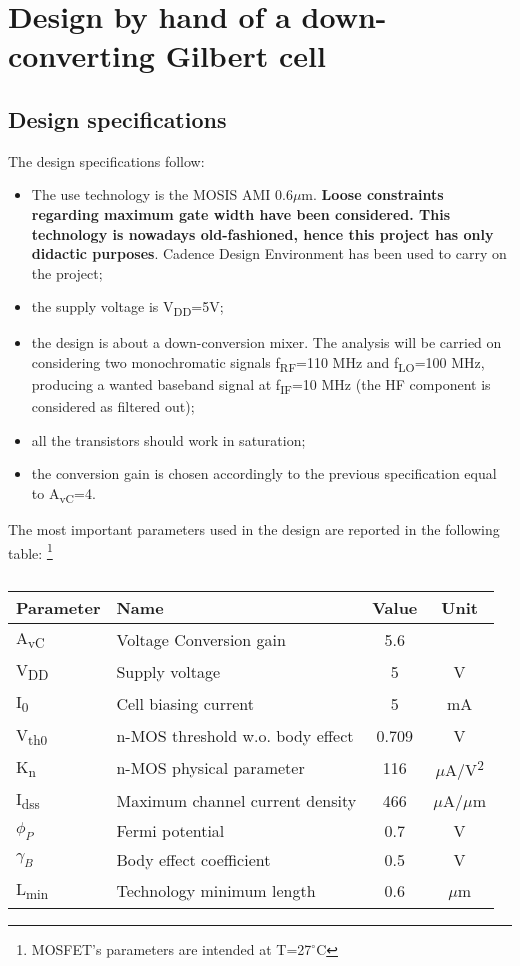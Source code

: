 \section{Design by hand of a down-converting Gilbert cell}

\subsection{Design specifications}
The design specifications follow:
\begin{itemize}
	\item The use technology is the MOSIS AMI 0.6$\mu$m. \textbf{Loose constraints regarding maximum gate width have been considered. This technology is nowadays  old-fashioned, hence this project has only didactic purposes}. Cadence Design Environment has been used to carry on the project;
	\item the supply voltage is V\textsubscript{DD}=5V;
	\item the design is about a down-conversion mixer. The analysis will be carried on considering two monochromatic signals f\textsubscript{RF}=110 MHz and f\textsubscript{LO}=100 MHz, producing a wanted baseband signal at f\textsubscript{IF}=10 MHz (the HF component is considered as filtered out);
	\item all the transistors should work in saturation;
	\item the conversion gain is chosen accordingly to the previous specification equal to A\textsubscript{vC}=4.
\end{itemize}
The most important parameters used in the design are reported in the following table: \footnote{MOSFET's parameters are intended at T=27$^\circ$C}
\begin{table} [h]
	\label{tab:specs}
	\caption{}
	\centering	
	\begin{tabular}{llcc} 
		\toprule 
		Parameter & Name			& Value 	& Unit \\ 
		\midrule
		A\textsubscript{vC} & Voltage Conversion gain & 5.6 & \\
		V\textsubscript{DD} & Supply voltage &	5 & V		\\
		I\textsubscript{0} & Cell biasing current & 5 & mA \\
		V\textsubscript{th0} & n-MOS threshold w.o. body effect& 0.709 &V		\\ 
		K\textsubscript{n} & n-MOS physical parameter& 116 & $\mu$A/V\textsuperscript{2}\\
		I\textsubscript{dss} & Maximum channel current density & 466 & $\mu$A/$\mu$m \\
		$\phi_P$ & Fermi potential & 0.7 & V \\
		$\gamma_B$ & Body effect coefficient & 0.5 & V \\
		L\textsubscript{min} & Technology minimum length & 0.6 & $\mu$m \\
		\bottomrule 
	\end{tabular}	
\end{table}

